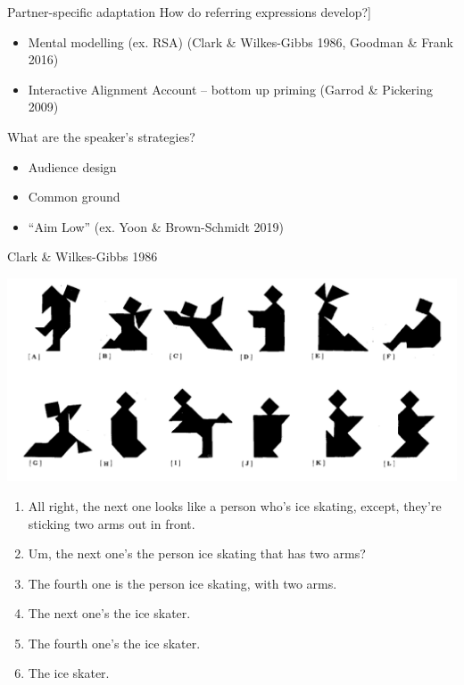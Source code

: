\documentclass[ 12pt, xcolor=beamer,table,usenames,dvipsnames, ignorenonframetext, ngerman]{beamer}
\begin{document}
\begin{frame}{Partner-specific adaptation}\pause
		How do referring expressions develop?]\pause
			\begin{itemize} 
		\item Mental modelling (ex. RSA) (Clark \& Wilkes-Gibbs 1986, Goodman \& Frank 2016) \pause
		\item Interactive Alignment Account -- bottom up priming (Garrod \& Pickering 2009)
	\end{itemize}\pause
	What are the speaker's strategies? \pause
	\begin{itemize}
		\item Audience design
		\item Common ground
		\item ``Aim Low'' (ex. Yoon \& Brown-Schmidt 2019)
	\end{itemize}

\end{frame}

%
\begin{frame}{Clark \& Wilkes-Gibbs 1986}
	\pause
	\vspace{-.2cm}
\begin{center}
	\includegraphics[width=.7\textwidth]{../images/clark_tangrams.png}
	\end{center}
\vspace{-.4cm}
\pause
\begin{small}
\begin{enumerate}
	\setlength{\itemsep}{-2pt}

	\item All right, the next one looks like a person who's ice skating, except, they're sticking two arms out in front. \pause
	\item Um, the next one's the person ice skating that has two arms? \pause
	\item The fourth one is the person ice skating, with two arms. \pause
	\item The next one's the ice skater. \pause
	\item The fourth one's the ice skater. \pause
	\item The ice skater.
	\end{enumerate}
\end{small}
\end{frame}
\end{document}
